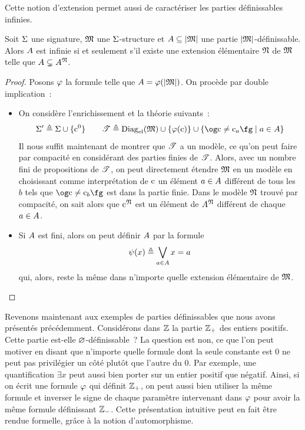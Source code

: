 Cette notion d'extension permet aussi de caractériser les parties définissables
infinies.

\begin{proposition}
  Soit $\Sigma$ une signature, $\mathfrak{M}$ une $\Sigma$-structure et
  $A\subseteq\left\vert \mathfrak{M}\right\vert$ une partie $\left\vert \mathfrak{M}\right\vert$-définissable. Alors $A$ est
  infinie si et seulement s'il existe une extension élémentaire $\mathfrak{N}$ de
  $\mathfrak{M}$ telle que $A\subsetneq A^{\mathfrak{N}}$.
\end{proposition}

\begin{proof}
  Posons $\varphi$ la formule telle que $A = \varphi(\left\vert \mathfrak{M}\right\vert)$.
  On procède par double implication~:
  \begin{itemize}
  \item[\fbox{$\Rightarrow$}] On considère l'enrichissement et la théorie
    suivants~:
    \[\Sign'\defeq \Sign\cup\{\Cc^0\}\qquad
    \varT\defeq \DiagEl(\varMM)\cup\{\varFF(\Cc)\}\cup
    \compr{\ogM\Cc \neq \Cc_a\fgM}{a \in \varPt}\]
    Il nous suffit maintenant de montrer que $\mathscr T$ a un modèle, ce qu'on peut
    faire par compacité en considérant des parties finies de $\mathscr T$. Alors,
    avec un nombre fini de propositions de $\mathscr T$, on peut directement
    étendre $\mathfrak{M}$ en un modèle en choisissant comme interprétation de $\mathrm{c}$
    un élément $a \in A$ différent de tous les $b$ tels que
    $\ogM\Cc\neq\Cc_b\fgM$ est dans la partie finie. Dans le modèle
    $\mathfrak{N}$ trouvé par compacité, on sait alors que $\mathrm{c}^{\mathfrak{N}}$ est un élément
    de $A^{\mathfrak{N}}$ différent de chaque $a\in A$.
  \item[\fbox{$\Leftarrow$}] Si $A$ est fini, alors on peut définir
    $A$ par la formule
    \[\psi(x) \triangleq \bigvee_{a \in A} x = a\]
    qui, alors, reste la même dans n'importe quelle extension élémentaire de
    $\mathfrak{M}$.\qedhere
  \end{itemize}
\end{proof}

Revenons maintenant aux exemples de parties définissables que nous avons
présentés précédemment. Considérons dans $\mathbb Z$ la partie $\mathbb Z_+$ des entiers
positifs. Cette partie est-elle $\varnothing$-définissable~? La question est non,
ce que l'on peut motiver en disant que n'importe quelle formule dont la seule
constante est $0$ ne peut pas privilégier un côté plutôt que l'autre du $0$.
Par exemple, une quantification $\exists x$ peut aussi bien porter sur un
entier positif que négatif. Ainsi, si on écrit une formule $\varphi$ qui
définit $\mathbb Z_+$, on peut aussi bien utiliser la même formule et inverser
le signe de chaque paramètre intervenant dans $\varphi$ pour avoir la
même formule définissant $\mathbb Z_-$. Cette présentation intuitive peut en fait
être rendue formelle, grâce à la notion d'automorphisme.

